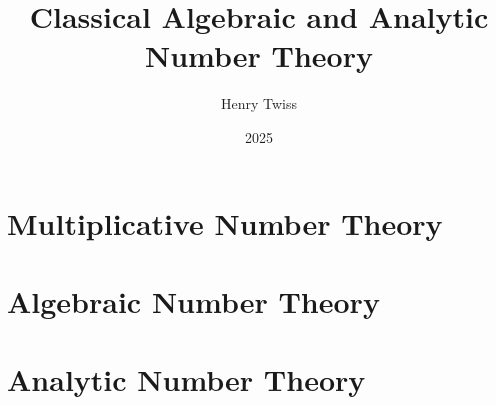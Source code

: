 \documentclass[12pt,oneside]{book}
\title{Classical Algebraic and Analytic Number Theory}
\author{Henry Twiss}
\date{2025}
\begin{document}
\maketitle
\pagestyle{empty}
\tableofcontents
\setcounter{page}{0}

\part{Multiplicative Number Theory}
  
  
  
\part{Algebraic Number Theory}
  
  

\part{Analytic Number Theory}
  
  
  

\appendix
  
  
  

\printindex
\end{document}
